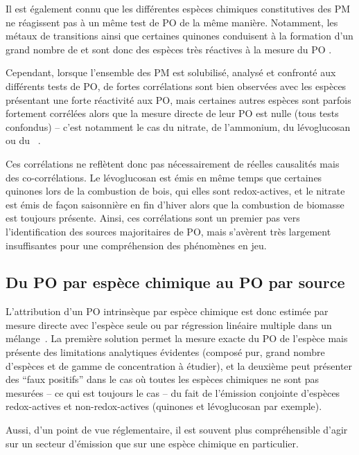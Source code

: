 Il est également connu que les différentes espèces chimiques constitutives des PM ne
réagissent pas à un même test de PO de la même manière. Notamment, les métaux de
transitions ainsi que certaines quinones conduisent à la formation d'un grand nombre de
 et sont donc des espèces très réactives à la mesure du PO
\autocite{charrierRates2015,calasImportance2017}.

Cependant, lorsque l'ensemble des PM est solubilisé, analysé et confronté aux différents
tests de PO, de fortes corrélations sont bien observées avec les espèces présentant une
forte réactivité aux PO, mais certaines autres espèces sont parfois fortement corrélées
alors que la mesure directe de leur PO est nulle (tous tests confondus) -- c'est notamment
le cas du nitrate, de l'ammonium, du lévoglucosan ou du
~\autocite{vermaRedox2009,calasComparison2018,calasSeasonal2019}.

Ces corrélations ne reflètent donc pas nécessairement de réelles causalités mais des
co-corrélations. Le lévoglucosan est émis en même temps que certaines quinones lors de la
combustion de bois, qui elles sont redox-actives, et le nitrate est émis de façon
saisonnière en fin d'hiver alors que la combustion de biomasse est toujours présente.
Ainsi, ces corrélations sont un premier pas vers l'identification des sources majoritaires
de PO, mais s'avèrent très largement insuffisantes pour une compréhension des phénomènes
en jeu.

\subsection{Du PO par espèce chimique au PO par source}

L'attribution d'un PO intrinsèque par espèce chimique est donc estimée par mesure
directe avec l'espèce seule ou par régression linéaire
multiple dans un mélange~\autocite{calasImportance2017,borlazaOxidative2018}. La première solution permet
la mesure exacte du PO de l'espèce mais présente des limitations analytiques évidentes
(composé pur, grand nombre d'espèces et de gamme de concentration à étudier), et la
deuxième peut présenter des ``faux positifs'' dans le cas où toutes les espèces chimiques
ne sont pas mesurées -- ce qui est toujours le cas -- du fait de l'émission conjointe
d'espèces redox-actives et non-redox-actives (quinones et lévoglucosan par exemple).

Aussi, d'un point de vue réglementaire, il est souvent plus compréhensible d'agir sur
un secteur d'émission que sur une espèce chimique en particulier.

